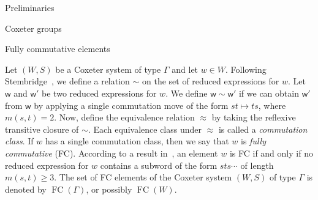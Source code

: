 \documentclass[11pt]{amsart}
\theoremstyle{definition}
\newtheorem{remark}[theorem]{Remark}
\numberwithin{equation}{section}
\newcommand{\C}{\widetilde{C}}
\renewcommand{\(}{\left(}
\renewcommand{\)}{\right)}
\newcommand{\w}{\mathsf{w}}
\DeclareMathOperator{\FC}{FC}
\begin{document}
\begin{section}{Preliminaries}
\begin{subsection}{Coxeter groups}

\end{subsection}


\begin{subsection}{Fully commutative elements}\label{subsec:FC}

Let $(W,S)$ be a Coxeter system of type $\Gamma$ and let $w \in W$. Following Stembridge~\cite{Stembridge1996}, we define a relation $\sim$ on the set of reduced expressions for $w$.  Let $\w$ and $\w'$ be two reduced expressions for $w$.  We define $\w \sim \w'$ if we can obtain $\w'$ from $\w$ by applying a single commutation move of the form $st \mapsto ts$, where $m(s,t)=2$.  Now, define the equivalence relation $\approx$ by taking the reflexive transitive closure of $\sim$.  Each equivalence class under $\approx$ is called a \emph{commutation class}. If $w$ has a single commutation class, then we say that $w$ is \emph{fully commutative} (FC).  According to a result in~\cite{Stembridge1996}, an element $w$ is FC if and only if no reduced expression for $w$ contains a subword of the form $sts \cdots$ of length $m(s,t) \geq 3$.  The set of FC elements of the Coxeter system $(W,S)$ of type $\Gamma$ is denoted by $\FC(\Gamma)$, or possibly $\FC(W)$.



\end{subsection}
\end{section}
\end{document}
